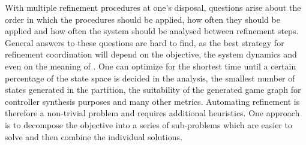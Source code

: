 With multiple refinement procedures at one's disposal, questions arise about the order in which the procedures should be applied, how often they should be applied and how often the system should be analysed between refinement steps.
General answers to these questions are hard to find, as the best strategy for refinement coordination will depend on the objective, the system dynamics and even on the meaning of .
One can optimize for the shortest time until a certain percentage of the state space is decided in the analysis, the smallest number of states generated in the partition, the suitability of the generated game graph for controller synthesis purposes and many other metrics.
Automating refinement is therefore a non-trivial problem and requires additional heuristics.
One approach is to decompose the objective into a series of sub-problems which are easier to solve and then combine the individual solutions.

